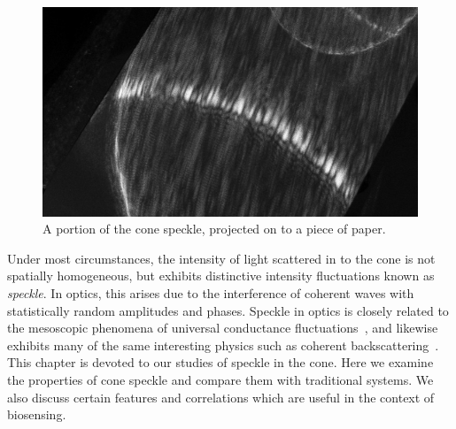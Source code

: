 \begin{figure}[ht]
\centering
\includegraphics[keepaspectratio,width=15cm]{speckle/figures/Ag_LaSFN9_cone_lens11_cam-8899.jpg}
\caption{A portion of the cone speckle, projected on to a piece of paper.}
\label{fig:examplespeckle}
\end{figure}

Under most circumstances, the intensity of light scattered in to the cone
is not spatially homogeneous, but exhibits distinctive intensity
fluctuations known as \textit{speckle}.  In optics, this arises due to the
interference of coherent waves with statistically random amplitudes and
phases.  Speckle in optics is closely related to the mesoscopic phenomena
of universal conductance fluctuations~\cite{lee1985universal}, and likewise
exhibits many of the same interesting physics such as coherent
backscattering~\cite{akkermans1986coherent}.  This chapter is devoted to
our studies of speckle in the cone.  Here we examine the properties of cone
speckle and compare them with traditional systems.  We also discuss certain
features and correlations which are useful in the context of biosensing.
